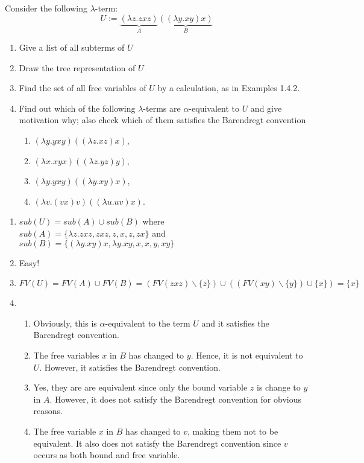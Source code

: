 \begin{problem}{1.4}
    Consider the following $\lambda$-term: 
    $$ U := \underbrace{(\lambda z.zxz)}_{A} \underbrace{((\lambda y.xy)x)}_{B} $$
    \begin{enumerate}[label=$(\alph*)$]
        \item Give a list of all subterms of $U$
        \item Draw the tree representation of $U$
        \item Find the set of all free variables of $U$ by a calculation, as in Examples 1.4.2.
        \item Find out which of the following $\lambda$-terms are $\alpha$-equivalent to $U$ and give motivation why; also check which of them satisfies the Barendregt convention
            \begin{enumerate}[label=$\roman*.$]
                \item $(\lambda y.yxy)((\lambda z.xz)x)$,
                \item $(\lambda x.xyx)((\lambda z.yz)y)$,
                \item $(\lambda y.yxy)((\lambda y.xy)x)$,
                \item $(\lambda v.(vx)v)((\lambda u.uv)x)$.
            \end{enumerate}
    \end{enumerate}
\end{problem}

\begin{solution}
    \begin{enumerate}[label=$(\alph*)$]
        \item $sub(U) = sub(A) \cup sub(B)$ where \\ $sub(A) = \{ \lambda z.zxz, zxz, z, x, z, zx \}$ 
            and \\ $sub(B) = \{ (\lambda y.xy)x, \lambda y.xy, x, x, y, xy  \}$
        
        \item Easy!
        \item $FV(U) = FV(A) \cup FV(B) = (FV(zxz) \backslash \{z\}) \cup ((FV(xy) \backslash \{y\}) \cup \{x\}) = \{ x \}$
        \item \begin{enumerate}[label=$\roman*.$]
            \item Obviously, this is $\alpha$-equivalent to the term $U$ and it satisfies the Barendregt convention.
            \item The free variables $x$ in $B$ has changed to $y$. Hence, it is not equivalent to $U$. However, it satisfies the Barendregt convention.
            \item Yes, they are are equivalent since only the bound variable $z$ is change to $y$ in $A$. However, it does not satisfy the Barendregt convention for obvious reasons.
            \item The free variable $x$ in $B$ has changed to $v$, making them not to be equivalent. It also does not satisfy the Barendregt convention since $v$ occurs as both bound and free variable.  
        \end{enumerate}
    \end{enumerate}
\end{solution}